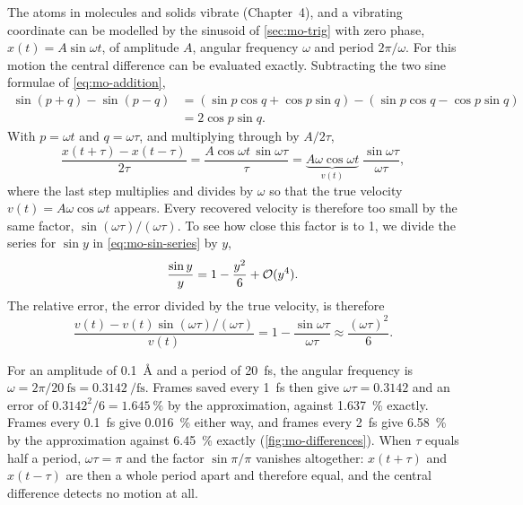 The atoms in molecules and solids vibrate (Chapter~4), and a vibrating
coordinate can be modelled by the sinusoid of \cref{sec:mo-trig} with zero
phase, $x(t) = A\sin\omega t$, of amplitude $A$, angular frequency $\omega$
and period $2\pi/\omega$. For this motion the central difference
can be evaluated exactly. Subtracting the two sine formulae of
\cref{eq:mo-addition},
\begin{align*}
   \sin(p+q) - \sin(p-q)
   &= (\sin p\cos q + \cos p\sin q) - (\sin p\cos q - \cos p\sin q)\\
   &= 2\cos p\sin q .
\end{align*}
With $p = \omega t$ and $q = \omega\tau$, and multiplying through by
$A/2\tau$,
\begin{equation}
   \frac{x(t+\tau) - x(t-\tau)}{2\tau}
   = \frac{A\cos\omega t\,\sin\omega\tau}{\tau}
   = \underbrace{A\omega\cos\omega t}_{v(t)}\;
     \frac{\sin\omega\tau}{\omega\tau} ,
   \label{eq:mo-sinc}
\end{equation}
where the last step multiplies and divides by $\omega$ so that the true
velocity $v(t) = A\omega\cos\omega t$ appears. Every recovered velocity is
therefore too small by the same factor, $\sin(\omega\tau)/(\omega\tau)$.
To see how close this factor is to 1, we divide the series for $\sin y$ in
\cref{eq:mo-sin-series} by $y$,
\begin{equation*}
   \frac{\sin y}{y} = 1 - \frac{y^2}{6} + \mathcal{O}(y^4) .
\end{equation*}
The relative error, the error divided by the true velocity, is therefore
\begin{equation*}
   \frac{v(t) - v(t)\sin(\omega\tau)/(\omega\tau)}{v(t)}
   = 1 - \frac{\sin\omega\tau}{\omega\tau} \approx \frac{(\omega\tau)^2}{6} .
\end{equation*}

For an amplitude of \SI{0.1}{\angstrom} and a period of
\SI{20}{\femto\second}, the angular frequency is $\omega =
2\pi/\SI{20}{\femto\second} = \SI{0.3142}{\per\femto\second}$. Frames
saved every \SI{1}{\femto\second} then give $\omega\tau = 0.3142$ and an
error of $0.3142^2/6 = \SI{1.645}{\percent}$ by the approximation, against
\SI{1.637}{\percent} exactly. Frames every \SI{0.1}{\femto\second} give
\SI{0.016}{\percent} either way, and frames every \SI{2}{\femto\second}
give \SI{6.58}{\percent} by the approximation against \SI{6.45}{\percent}
exactly (\cref{fig:mo-differences}). When $\tau$ equals half a
period, $\omega\tau = \pi$ and the factor $\sin\pi/\pi$ vanishes
altogether: $x(t+\tau)$ and $x(t-\tau)$ are then a whole period apart and
therefore equal, and the central difference detects no motion at all.

